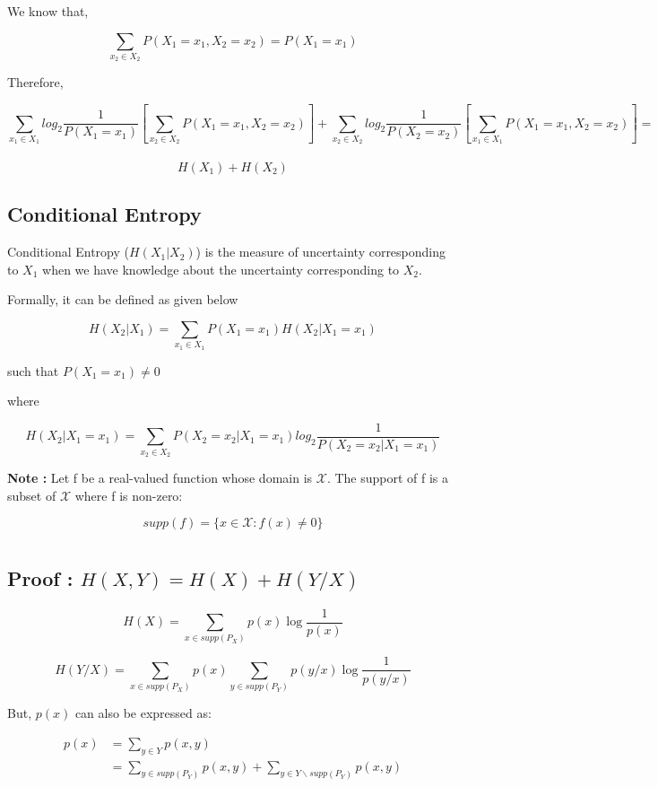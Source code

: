 \documentclass{article}
\begin{document}
We know that,

\[\sum_{x_2 \in X_2}P(X_1 = x_1, X_2 = x_2) = P(X_1 = x_1)\]

Therefore,

\[\sum_{x_1 \in X_1}log_2\frac{1}{P(X_1=x_1)}[\sum_{x_2 \in X_2}P(X_1 = x_1, X_2 = x_2)] + 
\sum_{x_2 \in X_2}log_2\frac{1}{P(X_2=x_2)}[\sum_{x_1 \in X_1}P(X_1 = x_1, X_2 = x_2)] = \]\\\[H(X_1) + H(X_2)\]


\subsection{Conditional Entropy}

Conditional Entropy (\(H(X_1 | X_2)\)) is the measure of uncertainty
corresponding to \(X_1\) when we have knowledge about the uncertainty
corresponding to \(X_2\).

Formally, it can be defined as given below

\[H(X_2|X_1) =\sum_{x_1 \in X_1} P(X_1 = x_1)H(X_2|X_1 = x_1)\]

such that \(P(X_1 = x_1)≠0\)

where

\[H(X_2|X_1 = x_1) = \sum_{x_2 \in X_2} P(X_2 = x_2 |X_1 = x_1)log_2 \frac{1}{P(X_2 = x_2 |X_1 = x_1)}\]


\textbf{{\Large Note : }} Let f be a real-valued function whose domain is $\mathcal{X}$. The support of f is a subset of $\mathcal{X}$ where f is non-zero:

\[supp(f) = \{x \in \mathcal{X} : f(x) \neq 0\} \]
\section{}
\subsection{Proof : $H(X,Y) = H(X) + H(Y/X)$}
\Small
\begin{equation}
H(X) = \sum_{x \in supp(P_X)}p(x) \log \frac {1}{p(x)} 
\end{equation}

\begin{equation}
H(Y/X) = \sum_{x \in supp(P_X)}p(x)\sum_{y \in supp(P_Y)}p(y/x)\log \frac {1}{p(y/x)}
\end{equation}

But, $p(x)$ can also be expressed as:

\begin{equation*}
\begin{split}
p(x) & = \sum_{y \in Y}p(x,y) \\
 & = \sum_{y \in supp(P_Y)}p(x,y)  + \sum_{y \in Y \backslash supp(P_Y)}p(x,y)
\end{split}  
\end{equation*}
\end{document}
